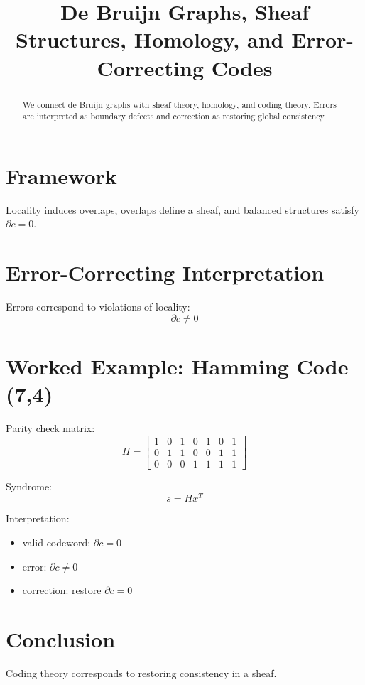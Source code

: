 \documentclass[conference]{IEEEtran}
\title{De Bruijn Graphs, Sheaf Structures, Homology, and Error-Correcting Codes}
\author{\IEEEauthorblockN{R.A. Posthumus}}
\begin{document}
\maketitle

\begin{abstract}
We connect de Bruijn graphs with sheaf theory, homology, and coding theory.
Errors are interpreted as boundary defects and correction as restoring global consistency.
\end{abstract}

\section{Framework}
Locality induces overlaps, overlaps define a sheaf, and balanced structures satisfy $\partial c=0$.

\section{Error-Correcting Interpretation}
Errors correspond to violations of locality:
\[
\partial c \neq 0
\]

\section{Worked Example: Hamming Code (7,4)}

Parity check matrix:
\[
H =
\begin{bmatrix}
1&0&1&0&1&0&1\\
0&1&1&0&0&1&1\\
0&0&0&1&1&1&1
\end{bmatrix}
\]

Syndrome:
\[
s = Hx^T
\]

Interpretation:
\begin{itemize}
\item valid codeword: $\partial c = 0$
\item error: $\partial c \neq 0$
\item correction: restore $\partial c = 0$
\end{itemize}

\section{Conclusion}
Coding theory corresponds to restoring consistency in a sheaf.
\end{document}
